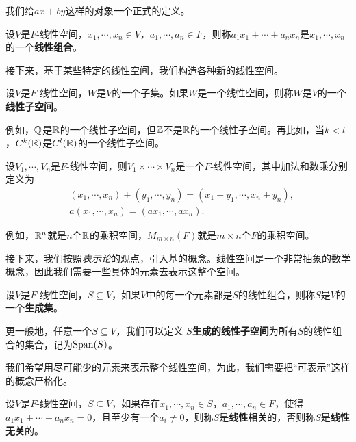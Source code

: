 我们给$ax+by$这样的对象一个正式的定义。

\begin{definition}[线性组合]
设$V$是$F$-线性空间，$x_1,\cdots,x_n\in V$，$a_1,\cdots,a_n\in F$，则称$a_1x_1+\cdots+a_nx_n$是$x_1,\cdots,x_n$的一个\textbf{线性组合}。
\end{definition}

接下来，基于某些特定的线性空间，我们构造各种新的线性空间。

\begin{definition}[线性子空间]
设$V$是$F$-线性空间，$W$是$V$的一个子集。如果$W$是一个线性空间，则称$W$是$V$的一个\textbf{线性子空间}。
\end{definition}

例如，$\mathbb{Q}$是$\mathbb{R}$的一个线性子空间，但$\mathbb{Z}$不是$\mathbb{R}$的一个线性子空间。再比如，当$k<l$，$C^k(\mathbb{R})$是$C^l(\mathbb{R})$的一个线性子空间。

\begin{definition}[乘积空间]
设$V_1,\cdots,V_n$是$F$-线性空间，则$V_1\times\cdots\times V_n$是一个$F$-线性空间，其中加法和数乘分别定义为
\begin{align*}
    &(x_1,\cdots,x_n)+(y_1,\cdots,y_n)=(x_1+y_1,\cdots,x_n+y_n),\\
    &a(x_1,\cdots,x_n)=(ax_1,\cdots,ax_n).
\end{align*}
\end{definition}

例如，$\mathbb{R}^n$就是$n$个$\mathbb{R}$的乘积空间，$M_{m\times n}(F)$就是$m\times n$个$F$的乘积空间。

接下来，我们按照\emph{表示论}的观点，引入基的概念。线性空间是一个非常抽象的数学概念，因此我们需要一些具体的元素去表示这整个空间。

\begin{definition}[生成集]
设$V$是$F$-线性空间，$S\subseteq V$，如果$V$中的每一个元素都是$S$的线性组合，则称$S$是$V$的一个\textbf{生成集}。

更一般地，任意一个$S\subseteq V$，我们可以定义 \textbf{$S$生成的线性子空间}为所有$S$的线性组合的集合，记为$\operatorname*{Span}(S)$。
\end{definition}

我们希望用尽可能少的元素来表示整个线性空间，为此，我们需要把“可表示”这样的概念严格化。

\begin{definition}[线性相关]
设$V$是$F$-线性空间，$S\subseteq V$，如果存在$x_1,\cdots,x_n\in S$，$a_1,\cdots,a_n\in F$，使得$a_1x_1+\cdots+a_nx_n=0$，且至少有一个$a_i\neq 0$，则称$S$是\textbf{线性相关}的，否则称$S$是\textbf{线性无关}的。
\end{definition}

